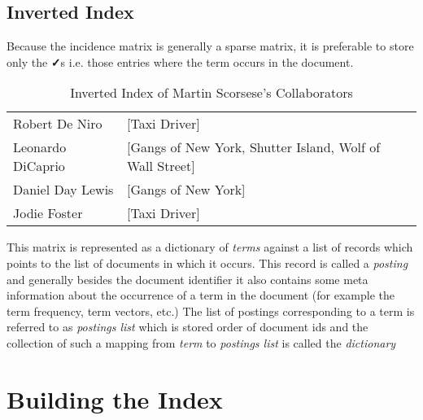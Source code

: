 \subsection{Inverted Index}
Because the incidence matrix is generally a sparse matrix, it is preferable to store only the \textbf{✓}s
i.e. those entries where the term occurs in the document.
\begin{table}[ht]
  \caption{Inverted Index of Martin Scorsese's Collaborators}
  \centering
  \begin{tabular}{p{4cm}p{7cm}}
    \hline \hline
    Robert De Niro    & [Taxi Driver] \\
    Leonardo DiCaprio & [Gangs of New York, Shutter Island, Wolf of Wall Street] \\
    Daniel Day Lewis  & [Gangs of New York] \\
    Jodie Foster      & [Taxi Driver] \\
  \end{tabular}
\end{table}

This matrix is represented as a dictionary of \textit{terms} against a list of records which points to the list of documents in which it occurs.
This record is called a \textit{posting} and generally besides the document identifier it also contains some meta information about the
occurrence of a term in the document (for example the term frequency, term vectors, etc.)
The list of postings corresponding to a term is referred to as \textit{postings list} which is stored order of document ids
and the collection of such a mapping from \textit{term} to \textit{postings list} is called the \textit{dictionary}

\section{Building the Index}

